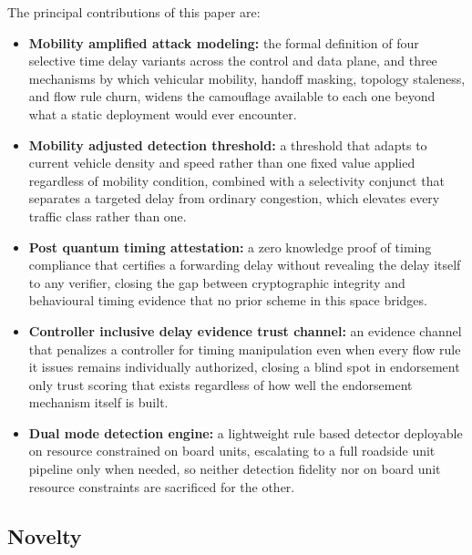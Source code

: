 \documentclass[final,5p,twocolumn]{elsarticle}
\theoremstyle{remark}
\theoremstyle{plain}
\begin{document}
The principal contributions of this paper are:
\begin{itemize}
	\item \textbf{Mobility amplified attack modeling:} the formal
	definition of four selective time delay variants across the control
	and data plane, and three mechanisms by which vehicular mobility,
	handoff masking, topology staleness, and flow rule churn, widens the
	camouflage available to each one beyond what a static deployment
	would ever encounter.
	\item \textbf{Mobility adjusted detection threshold:} a threshold
	that adapts to current vehicle density and speed rather than one
	fixed value applied regardless of mobility condition, combined with a
	selectivity conjunct that separates a targeted delay from ordinary
	congestion, which elevates every traffic class rather than one.
	\item \textbf{Post quantum timing attestation:} a zero knowledge
	proof of timing compliance that certifies a forwarding delay without
	revealing the delay itself to any verifier, closing the gap between
	cryptographic integrity and behavioural timing evidence that no prior
	scheme in this space bridges.
	\item \textbf{Controller inclusive delay evidence trust channel:} an
	evidence channel that penalizes a controller for timing manipulation
	even when every flow rule it issues remains individually authorized,
	closing a blind spot in endorsement only trust scoring that exists
	regardless of how well the endorsement mechanism itself is built.
	\item \textbf{Dual mode detection engine:} a lightweight rule based
	detector deployable on resource constrained on board units, escalating
	to a full roadside unit pipeline only when needed, so neither
	detection fidelity nor on board unit resource constraints are
	sacrificed for the other.
\end{itemize}

\subsection{Novelty}
\end{document}
